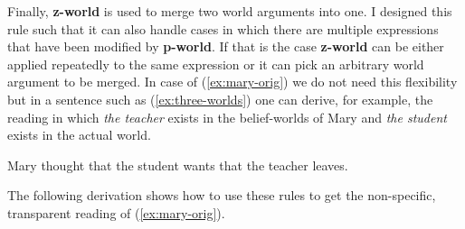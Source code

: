 \documentclass[parskip=half]{scrartcl}
\begin{document}
Finally, \textbf{z-world} is used to merge two world arguments into one. I designed this rule such that it can also handle cases in which there are multiple
expressions that have been modified by \textbf{p-world}. If that is the case \textbf{z-world} can be either applied repeatedly to the same expression or it can 
pick an arbitrary world argument to be merged. In case of (\ref{ex:mary-orig}) we do not need this flexibility but in a sentence such as (\ref{ex:three-worlds}) one can derive, for example,  
the reading in which \textit{the teacher} exists in the belief-worlds of Mary and \textit{the student} exists in the actual world.

\begin{exe}
\ex \label{ex:three-worlds} Mary thought that the student wants that the teacher leaves. 
\end{exe}

The following derivation shows how to use these rules to get the non-specific, transparent reading of (\ref{ex:mary-orig}).

\end{document}
